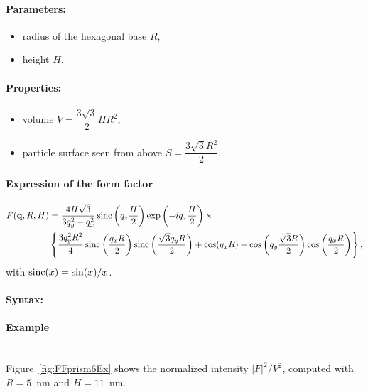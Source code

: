 \FloatBarrier

\paragraph{Parameters:}
\begin{itemize}
\item radius of the hexagonal base $R$,
\item height $H$.
\end{itemize}

\paragraph{Properties:}
\begin{itemize}
\item volume $V = \dfrac{3\sqrt{3}}{2}H R^2$,
\item particle surface seen from above $S =\dfrac{3\sqrt{3}R^2}{2}$.
\end{itemize}

\paragraph{Expression of the form factor}
\begin{align*}
F(\mathbf{q}, R, H) &= \frac{4H\sqrt{3}}{3q_y^2 - q_x^2}
\operatorname{sinc}\left(q_z\frac{H}{2}\right) \exp\left(-i q_z\frac{ H}{2}\right)\times\\
&\left\{\frac{3q_y^2R^2}{4} \operatorname{sinc}\left(\frac{q_x
  R}{2}\right)\operatorname{sinc}\left(\frac{\sqrt{3}q_yR }{2}\right)+ \cos(q_x R)-\cos\left(q_y
\frac{\sqrt{3}R}{2}\right) \cos\left(\frac{q_x R}{2}\right)\right\},
\end{align*}
with $\operatorname{sinc}(x)=\sin(x)/x$.

\paragraph{Syntax:}  

\newpage

\paragraph{Example}\mbox{}\\
Figure~\ref{fig:FFprism6Ex} shows the normalized intensity
$|F|^2/V^2$, computed with $R=5$~nm and \mbox{$H=11$~nm.}


